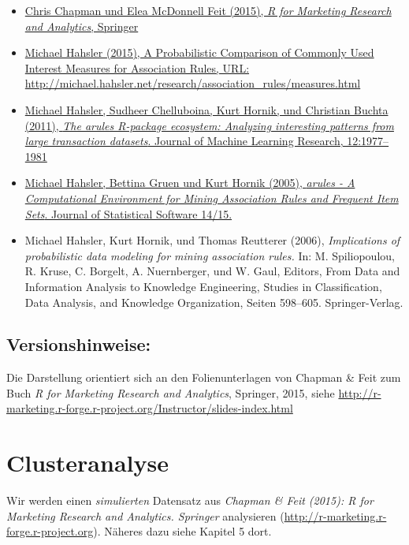 \documentclass[12pt,]{book}
\providecommand{\tightlist}{%
  \setlength{\itemsep}{0pt}\setlength{\parskip}{0pt}}
\begin{document}
\begin{itemize}
\tightlist
\item
  \href{http://r-marketing.r-forge.r-project.org}{Chris Chapman und Elea
  McDonnell Feit (2015), \emph{R for Marketing Research and Analytics},
  Springer}
\item
  \href{http://michael.hahsler.net/research/association_rules/measures.html}{Michael
  Hahsler (2015), A Probabilistic Comparison of Commonly Used Interest
  Measures for Association Rules, URL:
  http://michael.hahsler.net/research/association\_rules/measures.html}
\item
  \href{http://jmlr.csail.mit.edu/papers/v12/hahsler11a.html}{Michael
  Hahsler, Sudheer Chelluboina, Kurt Hornik, und Christian Buchta
  (2011), \emph{The arules R-package ecosystem: Analyzing interesting
  patterns from large transaction datasets}. Journal of Machine Learning
  Research, 12:1977--1981}
\item
  \href{http://dx.doi.org/10.18637/jss.v014.i15}{Michael Hahsler,
  Bettina Gruen und Kurt Hornik (2005), \emph{arules - A Computational
  Environment for Mining Association Rules and Frequent Item Sets}.
  Journal of Statistical Software 14/15.}
\item
  Michael Hahsler, Kurt Hornik, und Thomas Reutterer (2006),
  \emph{Implications of probabilistic data modeling for mining
  association rules.} In: M. Spiliopoulou, R. Kruse, C. Borgelt, A.
  Nuernberger, und W. Gaul, Editors, From Data and Information Analysis
  to Knowledge Engineering, Studies in Classification, Data Analysis,
  and Knowledge Organization, Seiten 598--605. Springer-Verlag.
\end{itemize}

\section{Versionshinweise:}\label{versionshinweise-1}

Die Darstellung orientiert sich an den Folienunterlagen von Chapman \&
Feit zum Buch \emph{R for Marketing Research and Analytics}, Springer,
2015, siehe
\url{http://r-marketing.r-forge.r-project.org/Instructor/slides-index.html}

\chapter{Clusteranalyse}\label{clusteranalyse}

Wir werden einen \emph{simulierten} Datensatz aus \emph{Chapman \& Feit
(2015): R for Marketing Research and Analytics. Springer} analysieren
(\url{http://r-marketing.r-forge.r-project.org}). Näheres dazu siehe
Kapitel 5 dort.
\end{document}
